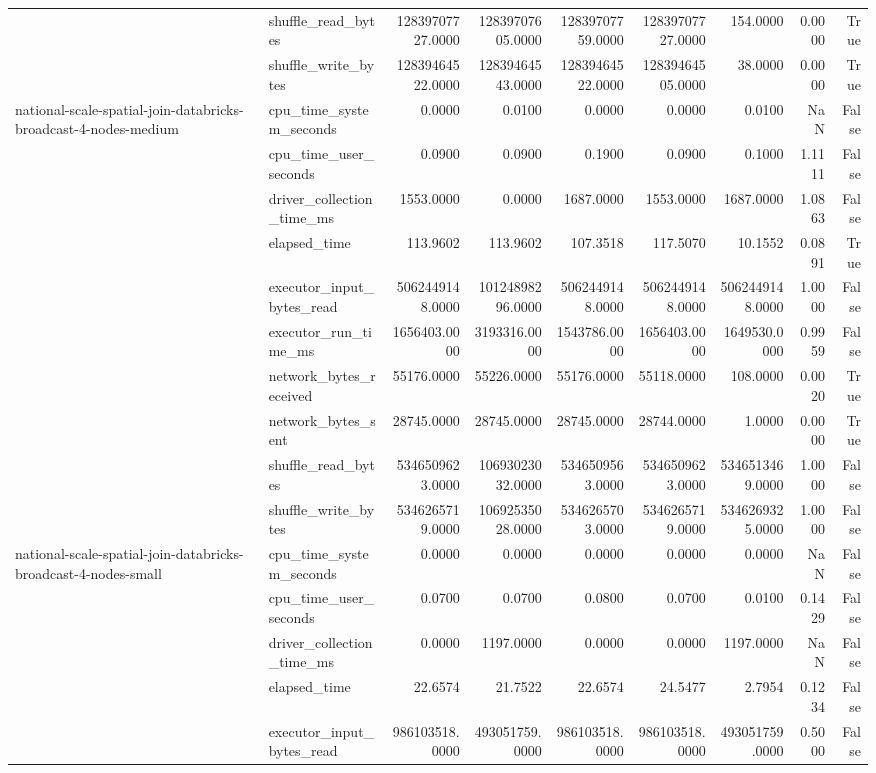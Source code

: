 \begin{tabular}{llrrrrrrr}
 & shuffle\_read\_bytes & 12839707727.0000 & 12839707605.0000 & 12839707759.0000 & 12839707727.0000 & 154.0000 & 0.0000 & True \\
 & shuffle\_write\_bytes & 12839464522.0000 & 12839464543.0000 & 12839464522.0000 & 12839464505.0000 & 38.0000 & 0.0000 & True \\
\cline{1-9}
\multirow[t]{10}{*}{national-scale-spatial-join-databricks-broadcast-4-nodes-medium} & cpu\_time\_system\_seconds & 0.0000 & 0.0100 & 0.0000 & 0.0000 & 0.0100 & NaN & False \\
 & cpu\_time\_user\_seconds & 0.0900 & 0.0900 & 0.1900 & 0.0900 & 0.1000 & 1.1111 & False \\
 & driver\_collection\_time\_ms & 1553.0000 & 0.0000 & 1687.0000 & 1553.0000 & 1687.0000 & 1.0863 & False \\
 & elapsed\_time & 113.9602 & 113.9602 & 107.3518 & 117.5070 & 10.1552 & 0.0891 & True \\
 & executor\_input\_bytes\_read & 5062449148.0000 & 10124898296.0000 & 5062449148.0000 & 5062449148.0000 & 5062449148.0000 & 1.0000 & False \\
 & executor\_run\_time\_ms & 1656403.0000 & 3193316.0000 & 1543786.0000 & 1656403.0000 & 1649530.0000 & 0.9959 & False \\
 & network\_bytes\_received & 55176.0000 & 55226.0000 & 55176.0000 & 55118.0000 & 108.0000 & 0.0020 & True \\
 & network\_bytes\_sent & 28745.0000 & 28745.0000 & 28745.0000 & 28744.0000 & 1.0000 & 0.0000 & True \\
 & shuffle\_read\_bytes & 5346509623.0000 & 10693023032.0000 & 5346509563.0000 & 5346509623.0000 & 5346513469.0000 & 1.0000 & False \\
 & shuffle\_write\_bytes & 5346265719.0000 & 10692535028.0000 & 5346265703.0000 & 5346265719.0000 & 5346269325.0000 & 1.0000 & False \\
\cline{1-9}
\multirow[t]{10}{*}{national-scale-spatial-join-databricks-broadcast-4-nodes-small} & cpu\_time\_system\_seconds & 0.0000 & 0.0000 & 0.0000 & 0.0000 & 0.0000 & NaN & False \\
 & cpu\_time\_user\_seconds & 0.0700 & 0.0700 & 0.0800 & 0.0700 & 0.0100 & 0.1429 & False \\
 & driver\_collection\_time\_ms & 0.0000 & 1197.0000 & 0.0000 & 0.0000 & 1197.0000 & NaN & False \\
 & elapsed\_time & 22.6574 & 21.7522 & 22.6574 & 24.5477 & 2.7954 & 0.1234 & False \\
 & executor\_input\_bytes\_read & 986103518.0000 & 493051759.0000 & 986103518.0000 & 986103518.0000 & 493051759.0000 & 0.5000 & False \\

\end{tabular}
